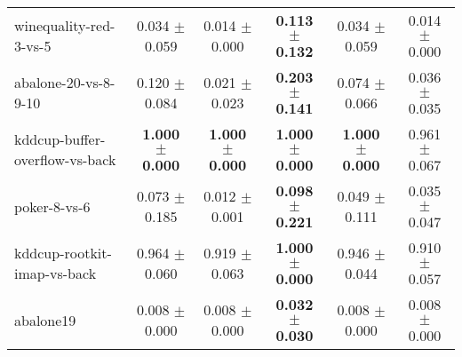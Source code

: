 \begin{table}[!ht]
{\begin{tabular}{l c c c c c}
winequality-red-3-vs-5 & 0.034 $\pm$ 0.059 & 0.014 $\pm$ 0.000 & \textbf{0.113 $\pm$ 0.132} & 0.034 $\pm$ 0.059 & 0.014 $\pm$ 0.000 \\
abalone-20-vs-8-9-10 & 0.120 $\pm$ 0.084 & 0.021 $\pm$ 0.023 & \textbf{0.203 $\pm$ 0.141} & 0.074 $\pm$ 0.066 & 0.036 $\pm$ 0.035 \\
kddcup-buffer-overflow-vs-back & \textbf{1.000 $\pm$ 0.000} & \textbf{1.000 $\pm$ 0.000} & \textbf{1.000 $\pm$ 0.000} & \textbf{1.000 $\pm$ 0.000} & 0.961 $\pm$ 0.067 \\
poker-8-vs-6 & 0.073 $\pm$ 0.185 & 0.012 $\pm$ 0.001 & \textbf{0.098 $\pm$ 0.221} & 0.049 $\pm$ 0.111 & 0.035 $\pm$ 0.047 \\
kddcup-rootkit-imap-vs-back & 0.964 $\pm$ 0.060 & 0.919 $\pm$ 0.063 & \textbf{1.000 $\pm$ 0.000} & 0.946 $\pm$ 0.044 & 0.910 $\pm$ 0.057 \\
abalone19 & 0.008 $\pm$ 0.000 & 0.008 $\pm$ 0.000 & \textbf{0.032 $\pm$ 0.030} & 0.008 $\pm$ 0.000 & 0.008 $\pm$ 0.000 \\
\end{tabular}}
\end{table}
